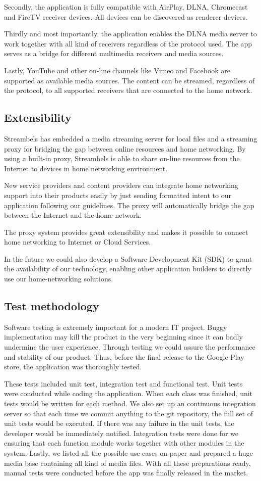 Secondly, the application is fully compatible with AirPlay, DLNA, Chromecast
and FireTV receiver devices. All devices can be discovered as renderer devices.

Thirdly and most importantly, the application enables the DLNA media server to
work together with all kind of receivers regardless of the protocol used. The
app serves as a bridge for different multimedia receivers and media sources.

Lastly, YouTube and other on-line channels like Vimeo and Facebook are
supported as available media sources. The content can be streamed, regardless
of the protocol, to all supported receivers that are connected to the home
network.

\subsection{Extensibility\label{3_5}}
Streambels has embedded a media streaming server for local files and a
streaming proxy for bridging the gap between online resources and home
networking. By using a built-in proxy, Streambels is able to share on-line
resources from the Internet to devices in home networking environment.

New service providers and content providers can integrate home networking
support into their products easily by just sending formatted intent to our
application following our guidelines. The proxy will automatically bridge the
gap between the Internet and the home network.

The proxy system provides great extensibility and makes it possible to connect
home networking to Internet or Cloud Services.

In the future we could also develop a Software Development Kit (SDK) to grant
the availability of our technology, enabling other application builders to
directly use our home-networking solutions.
\subsection{Test methodology\label{3_6}}
Software testing is extremely important for a modern IT project. Buggy
implementation may kill the product in the very beginning since it can badly
undermine the user experience. Through testing we could assure the performance
and stability of our product. Thus, before the final release to the Google Play
store, the application was thoroughly tested.

These tests included unit test, integration test and functional test.
Unit tests were conducted while coding the application. When each class was
finished, unit tests would be written for each method. We also set up an
continuous integration server so that each time we commit anything to the git
repository, the full set of unit tests would be executed. If there was any
failure in the unit tests, the developer would be immediately notified.
Integration tests were done for we ensuring that each function module works
together with other modules in the system. Lastly, we listed all the possible
use cases on paper and prepared a huge media base containing all kind of
media files. With all these preparations ready, manual tests were conducted
before the app was finally released in the market.

